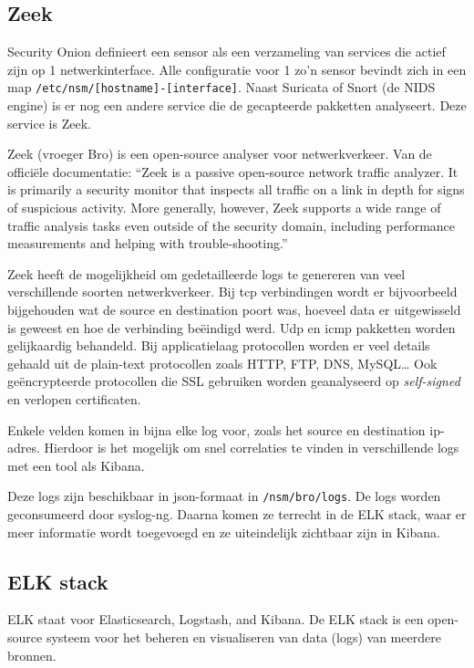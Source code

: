 \documentclass[a4paper,12pt]{report}
\begin{document}
\subsection{Zeek}
Security Onion definieert een sensor als een verzameling van services die actief zijn op 1 netwerkinterface.
Alle configuratie voor 1 zo'n sensor bevindt zich in een map \lstinline|/etc/nsm/[hostname]-[interface]|.
Naast Suricata of Snort (de NIDS engine) is er nog een andere service die de gecapteerde pakketten analyseert.
Deze service is Zeek.

Zeek (vroeger Bro) is een open-source analyser voor netwerkverkeer.
Van de officiële documentatie:
``Zeek is a passive open-source network traffic analyzer.
It is primarily a security monitor that inspects all traffic on a link in depth for signs of suspicious activity.
More generally, however, Zeek supports a wide range of traffic analysis tasks even outside of the security domain, including performance measurements and helping with trouble-shooting.''
\autocite{zeek:docs}

Zeek heeft de mogelijkheid om gedetailleerde logs te genereren van veel verschillende soorten netwerkverkeer.
Bij tcp verbindingen wordt er bijvoorbeeld bijgehouden wat de source en destination poort was, hoeveel data er uitgewisseld is geweest en hoe de verbinding beëindigd werd.
Udp en icmp pakketten worden gelijkaardig behandeld.
Bij applicatielaag protocollen worden er veel details gehaald uit de plain-text protocollen zoals HTTP, FTP, DNS, MySQL\dots
Ook geëncrypteerde protocollen die SSL gebruiken worden geanalyseerd op \emph{self-signed} en verlopen certificaten.

Enkele velden komen in bijna elke log voor, zoals het source en destination ip-adres.
Hierdoor is het mogelijk om snel correlaties te vinden in verschillende logs met een tool als Kibana.

Deze logs zijn beschikbaar in json-formaat in \lstinline|/nsm/bro/logs|.
De logs worden geconsumeerd door syslog-ng.
Daarna komen ze terrecht in de ELK stack, waar er meer informatie wordt toegevoegd en ze uiteindelijk zichtbaar zijn in Kibana.
\autocite{so:docs}

\subsection{ELK stack}
ELK staat voor Elasticsearch, Logstash, and Kibana.
De ELK stack is een open-source systeem voor het beheren en visualiseren van data (logs) van meerdere bronnen.
\end{document}
